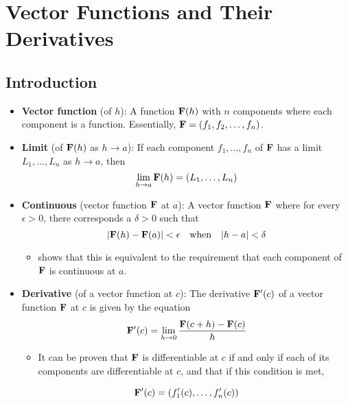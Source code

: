 \documentclass[../main.tex]{subfiles}
\begin{document}
\chapter{Vector Functions and Their Derivatives}
\section{Introduction}
\begin{itemize}
    \item {}\textbf{Vector function} (of $h$): A function $\vb{F}(h)$ with $n$ components where each component is a function. Essentially, $\vb{F}=(f_1,f_2,\dots,f_n)$.
    \item \textbf{Limit} (of $\vb{F}(h)$ as $h\to a$): If each component $f_1,\dots,f_n$ of $\vb{F}$ has a limit $L_1,\dots,L_n$ as $h\to a$, then
    \begin{equation*}
        \lim_{h\to a}\vb{F}(h) = (L_1,\dots,L_n)
    \end{equation*}
    \item \textbf{Continuous} (vector function $\vb{F}$ at $a$): A vector function $\vb{F}$ where for every $\epsilon>0$, there corresponds a $\delta>0$ such that
    \begin{equation*}
        |\vb{F}(h)-\vb{F}(a)|<\epsilon\quad\text{when}\quad|h-a|<\delta
    \end{equation*}
    \begin{itemize}
        \item \textcite{bib:Thomas} shows that this is equivalent to the requirement that each component of $\vb{F}$ is continuous at $a$.
    \end{itemize}
    \item \textbf{Derivative} (of a vector function at $c$): The derivative $\vb{F}'(c)$ of a vector function $\vb{F}$ at $c$ is given by the equation
    \begin{equation*}
        \vb{F}'(c) = \lim_{h\to 0}\frac{\vb{F}(c+h)-\vb{F}(c)}{h}
    \end{equation*}
    \begin{itemize}
        \item It can be proven that $\vb{F}$ is differentiable at $c$ if and only if each of its components are differentiable at $c$, and that if this condition is met,
    \end{itemize}
    \begin{equation*}
        \vb{F}'(c) = (f_1'(c),\dots,f_n'(c))
    \end{equation*}
\end{itemize}
\end{document}
